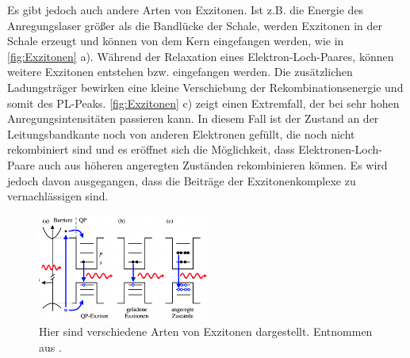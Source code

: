    Es gibt jedoch auch andere Arten von Exzitonen.
    Ist z.B. die Energie des Anregungslaser größer als die Bandlücke der Schale, werden Exzitonen in der Schale erzeugt und können von dem Kern eingefangen werden, wie in \autoref{fig:Exzitonen} a).
    Während der Relaxation eines Elektron-Loch-Paares, können weitere Exzitonen entstehen bzw. eingefangen werden.
    Die zusätzlichen Ladungsträger bewirken eine kleine Verschiebung der Rekombinationsenergie und somit des PL-Peaks.
    \autoref{fig:Exzitonen} c) zeigt einen Extremfall, der bei sehr hohen Anregungsintensitäten passieren kann.
    In diesem Fall ist der Zustand an der Leitungsbandkante noch von anderen Elektronen gefüllt, die noch nicht rekombiniert sind und es eröffnet sich die Möglichkeit, dass Elektronen-Loch-Paare auch aus höheren angeregten Zuständen rekombinieren können. 
    Es wird jedoch davon ausgegangen, dass die Beiträge der Exzitonenkomplexe zu vernachlässigen sind.
    \begin{figure}[ht]
        \centering\captionsetup{format=plain}
        \includegraphics[width=0.5\textwidth]{bilder/Exzitonen.png}
        \caption{Hier sind verschiedene Arten von Exzitonen dargestellt. Entnommen aus \cite{Photolumineszenz}.}
        \label{fig:Exzitonen}
    \end{figure}

